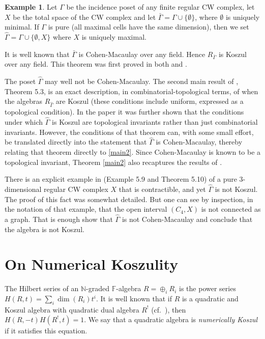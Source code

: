 \documentclass[11pt,righttag]{amsart}
\theoremstyle{definition}
\newtheorem{example}[thm]{Example}
\begin{document}
\begin{example}\label{CW}
Let $\Gamma$ be the incidence poset of any finite regular CW complex, let $X$ be the total space of the CW complex and let 
$\bar\Gamma = \Gamma\cup \{\emptyset\}$, where $\emptyset$ is uniquely minimal.   If $\Gamma$ is pure (all maximal cells 
have the same dimension), then we set $\hat \Gamma = \Gamma \cup \{ \emptyset, X\}$ where $X$ is uniquely maximal.  

It is well known that $\bar \Gamma$ is Cohen-Macaulay over any field.  Hence $R_{\bar \Gamma}$ is Koszul over any field.  
This theorem was first proved in both \cite{RSW3} and \cite{CPS}.

The poset $\hat \Gamma$ may well not be Cohen-Macaulay. The second main result of \cite{CPS}, Theorem 5.3, is an exact description, in combinatorial-topological terms, of when the algebras $R_{\hat\Gamma}$ 
are Koszul (these conditions include uniform, expressed as a topological condition).  In the paper \cite{SadSh} it was further shown that the conditions under which $\hat\Gamma$ is Koszul  are topological invariants rather than just combinatorial invariants.  However, the conditions of that theorem can, with some small effort, be translated directly into the statement that $\hat\Gamma$ is Cohen-Macaulay, thereby relating that theorem directly to \ref{main2}. Since Cohen-Macaulay is known to be a topological invariant, Theorem \ref{main2} also recaptures the results of \cite{SadSh}.  

There is an explicit example in \cite{CPS} (Example 5.9 and Theorem 5.10) of a pure 3-dimensional regular CW complex $X$ that 
is contractible, and yet $\hat \Gamma$ is not Koszul.  The proof of this fact was somewhat detailed.  But one can see by inspection, in 
the notation of that example, that the open interval $(C_4, X)$ is not connected as a graph.  That is enough show that $\hat\Gamma$ 
is not Cohen-Macaulay and conclude that the algebra is not Koszul.  
\end{example}

\section{On Numerical Koszulity}

The Hilbert series of an ${{\mathbb N}}$-graded ${{\mathbb F}}$-algebra $R = \oplus_iR_i$ is the power series $H(R,t) = \sum_i \dim(R_i)t^i$.  It is well known that if $R$ is a quadratic and Koszul algebra with quadratic dual algebra $R^!$ (cf.~\cite{PP}), then $H(R,-t)H(R^!,t) = 1$.   We say that a quadratic algebra is {\it numerically Koszul} if it satisfies this equation.  
\end{document}
